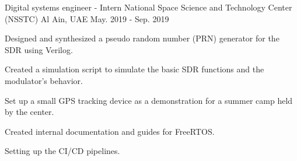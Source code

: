 \begin{cventries}
    \cventry
    {Digital systems engineer - Intern} %
    {National Space Science and Technology Center (NSSTC)} %
    {Al Ain, UAE} %
    {May. 2019 - Sep. 2019} %
    { %
        \begin{cvitems}
            \item {Designed and synthesized a pseudo random number (PRN) generator for the SDR using Verilog.}
            \item {Created a simulation script to simulate the basic SDR functions and the modulator’s behavior.}
            \item {Set up a small GPS tracking device as a demonstration for a summer camp held by the center.}
            \item {Created internal documentation and guides for FreeRTOS.}
            \item {Setting up the CI/CD pipelines.}
        \end{cvitems}
    }




\end{cventries}